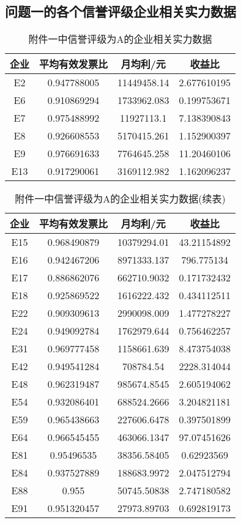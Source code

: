 \documentclass{cumcmthesis}
\begin{document}
\begin{appendices}
\section{问题一的各个信誉评级企业相关实力数据}
\begin{table}[H]   %
	\caption{附件一中信誉评级为A的企业相关实力数据}\label{tab:001} \centering
	\begin{tabular}{cccc}
		\toprule[1.5pt]
		企业 & 平均有效发票比     & 月均利/元          & 收益比          \\
		\midrule[1pt]
		E2  & 0.947788005 & 11449458.14  & 2.677610195  \\
		E6  & 0.910869294 & 1733962.083  & 0.199753671  \\
		E7  & 0.975488992 & 11927113.1   & 7.138390843  \\
		E8  & 0.926608553 & 5170415.261  & 1.152900397  \\
		E9  & 0.976691633 & 7764645.258  & 11.20460106  \\
		E13 & 0.917290061 & 3169112.982  & 1.162096237  \\
		\bottomrule[1.5pt]
\end{tabular}
\end{table}
\begin{table}[H]   %
	\caption{附件一中信誉评级为A的企业相关实力数据(续表)} \centering
	\begin{tabular}{cccc}
		\toprule[1.5pt]
		企业 & 平均有效发票比     & 月均利/元          & 收益比          \\
		\midrule[1pt]

		E15 & 0.968490879 & 10379294.01  & 43.21154892  \\
		E16 & 0.942467206 & 8971333.137  & 796.775134   \\
		E17 & 0.886862076 & 662710.9032  & 0.171732432  \\
		E18 & 0.925869522 & 1616222.432  & 0.434112511  \\
		E22 & 0.909309613 & 2990098.009  & 1.477278227  \\
		E24 & 0.949092784 & 1762979.644  & 0.756462257  \\
		E31 & 0.969777458 & 1158661.639  & 8.473754038  \\
		E42 & 0.949541284 & 708784.54    & 2228.314044  \\
		E48 & 0.962319487 & 985674.8545  & 2.605194062  \\
		E54 & 0.932086401 & 688524.2666  & 3.204821181  \\
		E59 & 0.965438663 & 227606.6478  & 0.397501899  \\
		E64 & 0.966545455 & 463066.1347  & 97.07451626  \\
		E81 & 0.95496535  & 38356.58405  & 0.62923569   \\
		E84 & 0.937527889 & 188683.9972  & 2.047512794  \\
		E88 & 0.955       & 50745.50838  & 2.747180582  \\
		E91 & 0.951320457 & 27973.89703  & 0.692819173 \\
		\bottomrule[1.5pt]
	\end{tabular}
\end{table}


\end{appendices}
\end{document}
